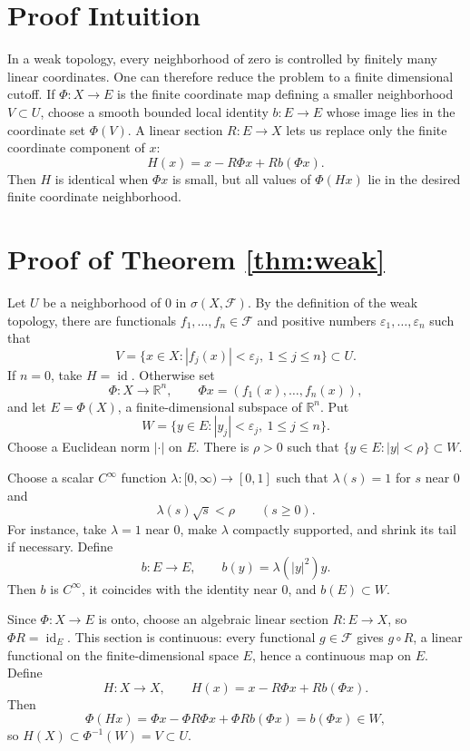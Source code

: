 \documentclass[11pt]{amsart}
\newcommand{\R}{\mathbb R}
\newcommand{\id}{\operatorname{id}}
\begin{document}
\section*{Proof Intuition}

In a weak topology, every neighborhood of zero is controlled by finitely many
linear coordinates.  One can therefore reduce the problem to a finite
dimensional cutoff.  If \(\Phi:X\to E\) is the finite coordinate map defining a
smaller neighborhood \(V\subset U\), choose a smooth bounded local identity
\(b:E\to E\) whose image lies in the coordinate set \(\Phi(V)\).  A linear
section \(R:E\to X\) lets us replace only the finite coordinate component of
\(x\):
\[
  H(x)=x-R\Phi x+R b(\Phi x).
\]
Then \(H\) is identical when \(\Phi x\) is small, but all values of \(\Phi(Hx)\)
lie in the desired finite coordinate neighborhood.

\section*{Proof of Theorem \ref{thm:weak}}

Let \(U\) be a neighborhood of \(0\) in \(\sigma(X,\mathcal F)\).  By the
definition of the weak topology, there are functionals
\(f_1,\ldots,f_n\in\mathcal F\) and positive numbers
\(\varepsilon_1,\ldots,\varepsilon_n\) such that
\[
  V=\{x\in X: |f_j(x)|<\varepsilon_j,\ 1\le j\le n\}\subset U .
\]
If \(n=0\), take \(H=\id\).  Otherwise set
\[
  \Phi:X\to\R^n,\qquad \Phi x=(f_1(x),\ldots,f_n(x)),
\]
and let \(E=\Phi(X)\), a finite-dimensional subspace of \(\R^n\).  Put
\[
  W=\{y\in E: |y_j|<\varepsilon_j,\ 1\le j\le n\}.
\]
Choose a Euclidean norm \(|\cdot|\) on \(E\).  There is \(\rho>0\) such that
\(\{y\in E: |y|<\rho\}\subset W\).

Choose a scalar \(C^\infty\) function \(\lambda:[0,\infty)\to[0,1]\) such that
\(\lambda(s)=1\) for \(s\) near \(0\) and
\[
  \lambda(s)\sqrt{s}<\rho\qquad(s\ge0).
\]
For instance, take \(\lambda=1\) near \(0\), make \(\lambda\) compactly
supported, and shrink its tail if necessary.  Define
\[
  b:E\to E,\qquad b(y)=\lambda(|y|^2)y .
\]
Then \(b\) is \(C^\infty\), it coincides with the identity near \(0\), and
\(b(E)\subset W\).

Since \(\Phi:X\to E\) is onto, choose an algebraic linear section
\(R:E\to X\), so \(\Phi R=\id_E\).  This section is continuous: every
functional \(g\in\mathcal F\) gives \(g\circ R\), a linear functional on the
finite-dimensional space \(E\), hence a continuous map on \(E\).  Define
\[
  H:X\to X,\qquad H(x)=x-R\Phi x+R b(\Phi x).
\]
Then
\[
  \Phi(Hx)=\Phi x-\Phi R\Phi x+\Phi R b(\Phi x)=b(\Phi x)\in W ,
\]
so \(H(X)\subset \Phi^{-1}(W)=V\subset U\).
\end{document}
